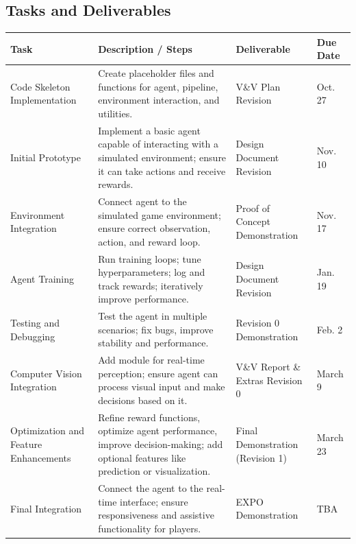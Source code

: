 \documentclass{article}
\begin{document}
  \subsection{Tasks and Deliverables}\label{subsec:tasks}
  \begin{table}[H]
    \centering
    \begin{tabular}{|p{3cm}|p{5cm}|p{3cm}|p{2cm}|}
    \hline
    \textbf{Task} & \textbf{Description / Steps} & \textbf{Deliverable} & \textbf{Due Date} \\ \hline
    
    Code Skeleton Implementation & Create placeholder files and functions for \RL{} agent, \CV{} pipeline, environment interaction, and utilities. & V\&V Plan Revision & Oct. 27 \\ \hline
    
    Initial \RL{} Prototype & Implement a basic \RL{} agent capable of interacting with a simulated environment; ensure it can take actions and receive rewards. & Design Document Revision & Nov. 10 \\ \hline
    
    Environment Integration & Connect \RL{} agent to the simulated game environment; ensure correct observation, action, and reward loop. & Proof of Concept Demonstration & Nov. 17 \\ \hline
    
    Agent Training & Run \RL{} training loops; tune hyperparameters; log and track rewards; iteratively improve performance. & Design Document Revision & Jan. 19 \\ \hline
    
    Testing and Debugging & Test the \RL{} agent in multiple scenarios; fix bugs, improve stability and performance. & Revision 0 Demonstration & Feb. 2 \\ \hline
    
    Computer Vision Integration & Add \CV{} module for real-time perception; ensure agent can process visual input and make decisions based on it. & V\&V Report \& Extras Revision 0 & March 9 \\ \hline
    
    Optimization and Feature Enhancements & Refine reward functions, optimize agent performance, improve decision-making; add optional features like prediction or visualization. & Final Demonstration (Revision 1) & March 23 \\ \hline
    
    Final Integration & Connect the agent to the real-time interface; ensure responsiveness and assistive functionality for players. & EXPO Demonstration & TBA \\ \hline
    

\end{tabular}
\end{table}
\end{document}
